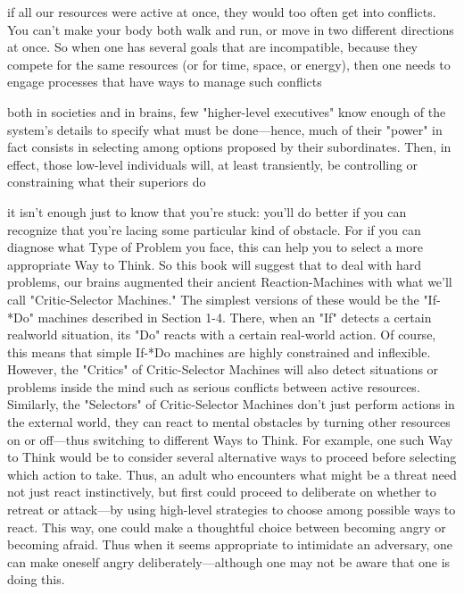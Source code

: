 \documentclass[10pt,a4paper]{article}
\begin{document}
if all our resources were active at once, they would too often get into conflicts. You can't make your body both walk and run, or move in two different directions at once. So when one has several goals that are incompatible, because they compete for the same resources (or for time, space, or energy), then one needs to engage processes that have ways to manage such conflicts \cite[p.~26]{minsky}

both in societies and in brains, few "higher-level executives" know enough of the system's details to specify what must be done—hence, much of their "power" in fact consists in selecting among options proposed by their subordinates. Then, in effect, those low-level individuals will, at least transiently, be controlling or constraining what their superiors do \cite[p.~26]{minsky}

it isn't enough just to know that you're stuck: you'll do better if you can recognize that you're lacing some particular kind of obstacle. For if you can diagnose what Type of Problem you face, this can help you to select a more appropriate Way to Think. So this book will suggest that to deal with hard problems, our brains augmented their ancient Reaction-Machines with what we'll call "Critic-Selector Machines." The simplest versions of these would be the "If-*Do" machines described in Section 1-4. There, when an "If" detects a certain realworld situation, its "Do" reacts with a certain real-world action. Of course, this means that simple If-*Do machines are highly constrained and inflexible. However, the "Critics" of Critic-Selector Machines will also detect situations or problems inside the mind such as serious conflicts between active resources. Similarly, the "Selectors" of Critic-Selector Machines don't just perform actions in the external world, they can react to mental obstacles by turning other resources on or off—thus switching to different Ways to Think. For example, one such Way to Think would be to consider several alternative ways to proceed before selecting which action to take. Thus, an adult who encounters what might be a threat need not just react instinctively, but first could proceed to deliberate on whether to retreat or attack—by using high-level strategies to choose among possible ways to react. This way, one could make a thoughtful choice between becoming angry or becoming afraid. Thus when it seems appropriate to intimidate an adversary, one can make oneself angry deliberately—although one may not be aware that one is doing this.\cite[p.~28-29]{minsky}
\end{document}
